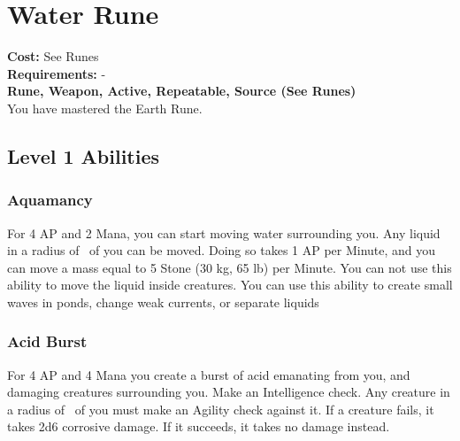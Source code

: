 \section{Water Rune}\label{rune:water}
\textbf{Cost:} See Runes\\
\textbf{Requirements:} -\\
\textbf{Rune, Weapon, Active, Repeatable, Source (See Runes)}\\
You have mastered the Earth Rune.

\subsection{Level 1 Abilities}

\subsubsection{Aquamancy}
For 4 AP and 2 Mana, you can start moving water surrounding you.
Any liquid in a radius of~ of you can be moved.
Doing so takes 1 AP per Minute, and you can move a mass equal to 5 Stone (30 kg, 65 lb) per Minute.
You can not use this ability to move the liquid inside creatures.
You can use this ability to create small waves in ponds, change weak currents, or separate liquids

\subsubsection{Acid Burst}
For 4 AP and 4 Mana you create a burst of acid emanating from you, and damaging creatures surrounding you.
Make an Intelligence check.
Any creature in a radius of~ of you must make an Agility check against it.
If a creature fails, it takes 2d6 corrosive damage.
If it succeeds, it takes no damage instead.